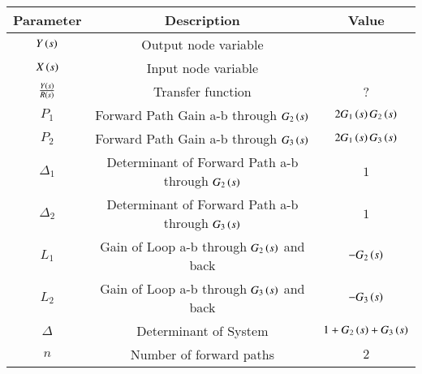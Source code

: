 \begin{tabular}{|c|c|c|}
    \hline
    \textbf{Parameter} & \textbf{Description} & \textbf{Value}\\ \hline
    $Y\left(s\right)$ & Output node variable &\\
    \hline
    $X\left(s\right)$ & Input node variable &\\
    \hline
    $\frac{Y\left(s\right)}{R\left(s\right)}$ & Transfer function & ?\\
    \hline
    $P_1$ & Forward Path Gain a-b through $G_2\left(s\right)$ & $ 2 G_1\left(s\right) G_2\left(s\right) $ \\
    \hline
    $P_2$ & Forward Path Gain a-b through $G_3\left(s\right)$ & $ 2 G_1\left(s\right) G_3\left(s\right)$ \\
    \hline
    $\Delta_1$ & Determinant of Forward Path a-b through $G_2\left(s\right)$ & $1$ \\
    \hline
    $\Delta_2$ & Determinant of Forward Path a-b through $G_3\left(s\right)$ & $1$ \\
    \hline
    $L_1$ & Gain of Loop a-b through $G_2\left(s\right)$ and back & $-G_2\left(s\right)$ \\
    \hline
    $L_2$ & Gain of Loop a-b through $G_3\left(s\right)$ and back & $-G_3\left(s\right)$ \\
    \hline 
    $\Delta$ & Determinant of System & $1+G_2\left(s\right)+G_3\left(s\right)$ \\
    \hline
    $n$ & Number of forward paths & $2$ \\
    \hline
    \end{tabular}